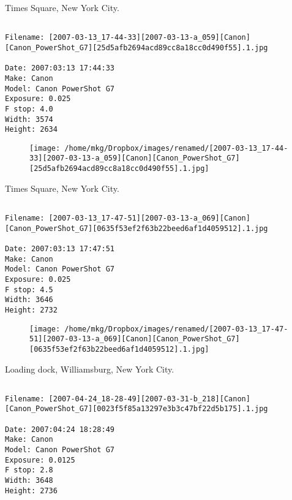 \clearpage
\onecolumn
\noindent Times Square, New York City.
\noindent
\begin{lstlisting}

Filename: [2007-03-13_17-44-33][2007-03-13-a_059][Canon][Canon_PowerShot_G7][25d5afb2694acd89cc8a18cc0d490f55].1.jpg

Date: 2007:03:13 17:44:33
Make: Canon
Model: Canon PowerShot G7
Exposure: 0.025
F stop: 4.0
Width: 3574
Height: 2634
\end{lstlisting}
\clearpage

\begin{figure}
\texttt{[image: /home/mkg/Dropbox/images/renamed/[2007-03-13\_17-44-33][2007-03-13-a\_059][Canon][Canon\_PowerShot\_G7][25d5afb2694acd89cc8a18cc0d490f55].1.jpg]}
\end{figure}
    
\clearpage
\onecolumn
\noindent Times Square, New York City.
\noindent
\begin{lstlisting}

Filename: [2007-03-13_17-47-51][2007-03-13-a_069][Canon][Canon_PowerShot_G7][0635f53ef2f63b22beed6af1d4059512].1.jpg

Date: 2007:03:13 17:47:51
Make: Canon
Model: Canon PowerShot G7
Exposure: 0.025
F stop: 4.5
Width: 3646
Height: 2732
\end{lstlisting}
\clearpage

\begin{figure}
\texttt{[image: /home/mkg/Dropbox/images/renamed/[2007-03-13\_17-47-51][2007-03-13-a\_069][Canon][Canon\_PowerShot\_G7][0635f53ef2f63b22beed6af1d4059512].1.jpg]}
\end{figure}
    
\clearpage
\onecolumn
\noindent Loading dock, Williamsburg, New York City.
\noindent
\begin{lstlisting}

Filename: [2007-04-24_18-28-49][2007-03-31-b_218][Canon][Canon_PowerShot_G7][0023f5f85a13297e3b3c47bf22d5b175].1.jpg

Date: 2007:04:24 18:28:49
Make: Canon
Model: Canon PowerShot G7
Exposure: 0.0125
F stop: 2.8
Width: 3648
Height: 2736
\end{lstlisting}
\clearpage

